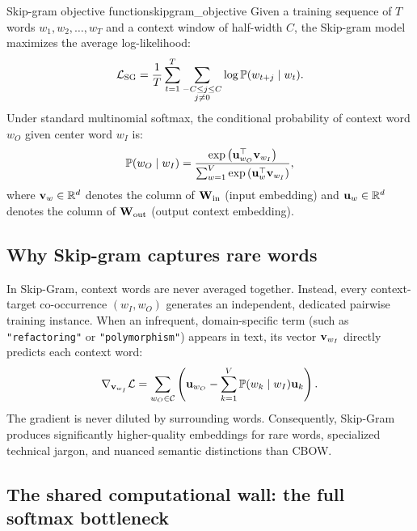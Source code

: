 \documentclass[../../main.tex]{subfiles}
\begin{document}
\begin{definition}{Skip-gram objective function}{skipgram_objective}
Given a training sequence of $T$ words $w_1, w_2, \dots, w_T$ and a context window of half-width $C$, the Skip-gram model maximizes the average log-likelihood:
\begin{equation}
\label{eq:skipgram_loglik}
\mathcal{L}_{\text{SG}} = \frac{1}{T} \sum_{t=1}^T \sum_{\substack{-C \le j \le C \\ j \neq 0}} \log \mathbb{P}(w_{t+j} \mid w_t).
\end{equation}
Under standard multinomial softmax, the conditional probability of context word $w_O$ given center word $w_I$ is:
\begin{equation}
\label{eq:skipgram_softmax}
\mathbb{P}(w_O \mid w_I) = \frac{\exp\left( \mathbf{u}_{w_O}^\top \mathbf{v}_{w_I} \right)}{\sum_{w=1}^V \exp\left( \mathbf{u}_w^\top \mathbf{v}_{w_I} \right)},
\end{equation}
where $\mathbf{v}_w \in \mathbb{R}^d$ denotes the column of $\mathbf{W}_{\text{in}}$ (input embedding) and $\mathbf{u}_w \in \mathbb{R}^d$ denotes the column of $\mathbf{W}_{\text{out}}$ (output context embedding).
\end{definition}

\subsection{Why Skip-gram captures rare words}
\label{subsec:skipgram_rare_words}

In Skip-Gram, context words are never averaged together. Instead, every context-target co-occurrence $(w_I, w_O)$ generates an independent, dedicated pairwise training instance. When an infrequent, domain-specific term (such as \texttt{"refactoring"} or \texttt{"polymorphism"}) appears in text, its vector $\mathbf{v}_{w_I}$ directly predicts each context word:
\begin{equation}
\label{eq:skipgram_pair_grad}
\nabla_{\mathbf{v}_{w_I}} \mathcal{L} = \sum_{w_O \in \mathcal{C}} \left( \mathbf{u}_{w_O} - \sum_{k=1}^V \mathbb{P}(w_k \mid w_I) \mathbf{u}_k \right).
\end{equation}
The gradient is never diluted by surrounding words. Consequently, Skip-Gram produces significantly higher-quality embeddings for rare words, specialized technical jargon, and nuanced semantic distinctions than CBOW.

\subsection{The shared computational wall: the full softmax bottleneck}
\label{subsec:softmax_bottleneck}
\end{document}

